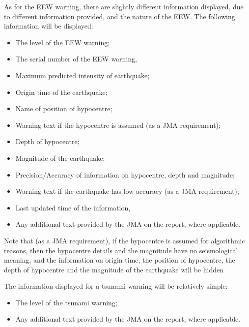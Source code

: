 As for the EEW warning, there are slightly different information displayed, due to different information provided, and the nature of the EEW. The following information will be displayed:
\begin{itemize}
    \item The level of the EEW warning;
    \item The serial number of the EEW warning,
    \item Maximum predicted intensity of earthquake;
    \item Origin time of the earthquake;
    \item Name of position of hypocentre;
    \item Warning text if the hypocentre is assumed (as a JMA requirement);
    \item Depth of hypocentre;
    \item Magnitude of the earthquake;
    \item Precision/Accuracy of information on hypocentre, depth and magnitude;
    \item Warning text if the earthquake has low accuracy (as a JMA requirement);
    \item Last updated time of the information,
    \item Any additional text provided by the JMA on the report, where applicable.
\end{itemize}

Note that (as a JMA requirement), if the hypocentre is assumed for algorithmic reasons, then the hypocentre details and the magnitude have no seismological meaning, and the information on origin time, the position of hypocentre, the depth of hypocentre and the magnitude of the earthquake will be hidden

The information displayed for a tsunami warning will be relatively simple:
\begin{itemize}
    \item The level of the tsunami warning;
    \item Any additional text provided by the JMA on the report, where applicable.
\end{itemize}